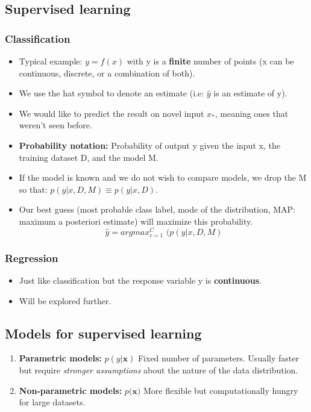 \documentclass[a4paper,11pt]{article}
\begin{document}
	\subsection{Supervised learning}
	\subsubsection{Classification}
	\begin{itemize}
		\item Typical example: $y=f(x)$ with y is a \textbf{finite} number of points (x can be continuous, discrete, or a combination of both).
		\item We use the hat symbol to denote an estimate (i.e: $\hat{y}$ is an estimate of y).
		\item We would like to predict the result on novel input $x_*$, meaning ones that weren't seen before.
		\item \textbf{Probability notation:} Probability of output y given the input x, the training dataset D, and the model M.
		
		\item If the model is known and we do not wish to compare models, we drop the M so that: $p(y | x, D, M) \equiv p(y | x, D)$.
		\item Our best guess (most probable class label, mode of the distribution, MAP: maximum a posteriori estimate) will maximize this probability.
		\[
		\hat{y}=argmax^C_{c=1} \, \, (p(y | x, D, M)
		\]
	\end{itemize}
	
	\subsubsection{Regression}
	\begin{itemize}
		\item Just like classification but the response variable y is \textbf{continuous}.
		\item Will be explored further.
	\end{itemize}
	\subsection{Models for supervised learning}
	\begin{enumerate}
		\item \textbf{Parametric models:} $p(y | \mathbf{x})$ Fixed number of parameters. Usually faster but require \emph{stronger assumptions} about the nature of the data distribution.
		\item \textbf{Non-parametric models:} $p(\mathbf{x)}$ More flexible but computationally hungry for large datasets.
	\end{enumerate}
\end{document}
